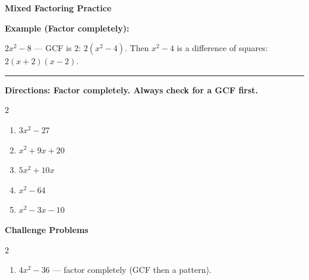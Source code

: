 \documentclass[12pt]{article}
\begin{document}
\vspace{0.35cm}

\begin{center}{\Large \textbf{Mixed Factoring Practice}}\end{center}\vspace{0.25cm}
\textbf{Example (Factor completely):}

$2x^{2}-8$ — GCF is $2$: $2(x^{2}-4)$. Then $x^2-4$ is a difference of squares: $2(x+2)(x-2)$.

\vspace{0.3cm}\hrule\vspace{0.4cm}
\textbf{Directions: Factor completely. Always check for a GCF first.}

\begin{multicols}{2}
\begin{enumerate}[label=\textbf{\arabic*.}, start=1, itemsep=2cm]
  \item $\displaystyle 3x^{2}-27$
  \item $\displaystyle x^{2}+9x+20$
  \item $\displaystyle 5x^{2}+10x$
  \item $\displaystyle x^{2}-64$
  \item $\displaystyle x^{2}-3x-10$
\end{enumerate}
\end{multicols}
\newpage

\begin{center}{\large \textbf{Challenge Problems}}\end{center}\vspace{0.3cm}
\begin{multicols}{2}\begin{enumerate}[label=\textbf{\arabic*.}, start=6, itemsep=2.6cm]
  \item $4x^{2}-36$ — factor completely (GCF then a pattern).
\end{enumerate}\end{multicols}\newpage
\end{document}
